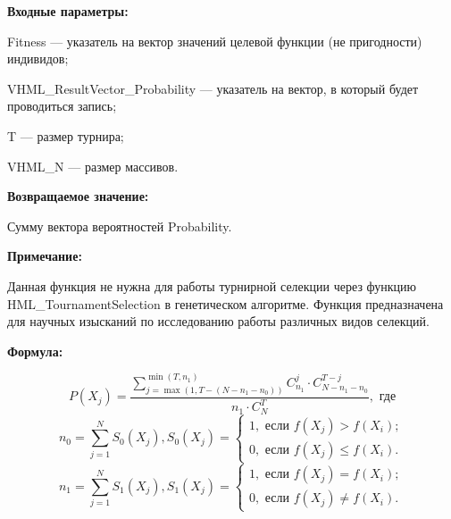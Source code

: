 \textbf{Входные параметры:}  
 
 Fitness --- указатель на вектор значений целевой функции (не пригодности) индивидов;
 
 VHML\_ResultVector\_Probability --- указатель на вектор, в который будет проводиться запись;
 
 T --- размер турнира;
 
 VHML\_N ---  размер массивов.

\textbf{Возвращаемое значение:}

 Сумму вектора вероятностей Probability.
 
  \textbf{Примечание:}
  
   Данная функция не нужна для работы турнирной селекции через функцию HML\_TournamentSelection в генетическом алгоритме. Функция предназначена для научных изысканий по исследованию работы  различных видов селекций.
 
 \textbf{Формула:}
 
\begin{equation*}
P\left( X_j\right) = \dfrac{\sum_{j=\max \left(1, T-\left( N-n_1-n_0\right)  \right) }^{\min \left( T, n_1\right) }C_{n_1}^j\cdot C_{ N-n_1-n_0}^{T-j}}{n_1\cdot C_N^T}, \text{ где}
\end{equation*}
\begin{equation*}
n_0=\sum_{j=1}^{N} S_0\left( X_j\right), S_0\left( X_j\right)=\left\lbrace \begin{aligned} 1, \text{ если } f\left( X_j\right)> f\left( X_i\right); \\ 0, \text{ если } f\left( X_j\right)\leq f\left( X_i\right). \end{aligned}\right.
\end{equation*}
\begin{equation*}
n_1=\sum_{j=1}^{N} S_1\left( X_j\right), S_1\left( X_j\right)=\left\lbrace \begin{aligned} 1, \text{ если } f\left( X_j\right)= f\left( X_i\right); \\ 0, \text{ если } f\left( X_j\right)\neq f\left( X_i\right). \end{aligned}\right.
\end{equation*}
